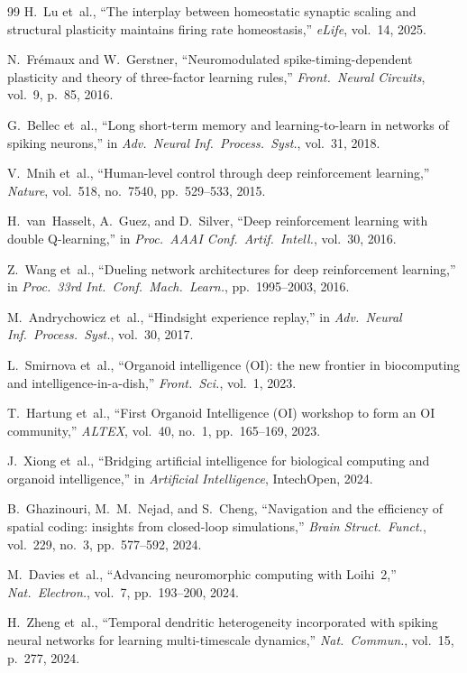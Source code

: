 \documentclass[journal,twocolumn]{IEEEtran}
\begin{document}
\begin{thebibliography}{99}
H.~Lu et~al., ``The interplay between homeostatic synaptic scaling and
structural plasticity maintains firing rate homeostasis,''
\emph{eLife}, vol.~14, 2025.

N.~Fr\'{e}maux and W.~Gerstner, ``Neuromodulated spike-timing-dependent
plasticity and theory of three-factor learning rules,''
\emph{Front.\ Neural Circuits}, vol.~9, p.~85, 2016.

G.~Bellec et~al., ``Long short-term memory and learning-to-learn in
networks of spiking neurons,'' in \emph{Adv.\ Neural Inf.\ Process.\
Syst.}, vol.~31, 2018.

V.~Mnih et~al., ``Human-level control through deep reinforcement
learning,'' \emph{Nature}, vol.~518, no.~7540, pp.~529--533, 2015.

H.~van~Hasselt, A.~Guez, and D.~Silver, ``Deep reinforcement learning
with double Q-learning,'' in \emph{Proc.\ AAAI Conf.\ Artif.\ Intell.},
vol.~30, 2016.

Z.~Wang et~al., ``Dueling network architectures for deep reinforcement
learning,'' in \emph{Proc.\ 33rd Int.\ Conf.\ Mach.\ Learn.},
pp.~1995--2003, 2016.

M.~Andrychowicz et~al., ``Hindsight experience replay,'' in
\emph{Adv.\ Neural Inf.\ Process.\ Syst.}, vol.~30, 2017.

L.~Smirnova et~al., ``Organoid intelligence (OI): the new frontier in
biocomputing and intelligence-in-a-dish,'' \emph{Front.\ Sci.},
vol.~1, 2023.

T.~Hartung et~al., ``First Organoid Intelligence (OI) workshop to
form an OI community,'' \emph{ALTEX}, vol.~40, no.~1,
pp.~165--169, 2023.

J.~Xiong et~al., ``Bridging artificial intelligence for biological
computing and organoid intelligence,'' in \emph{Artificial
Intelligence}, IntechOpen, 2024.

B.~Ghazinouri, M.~M.~Nejad, and S.~Cheng, ``Navigation and the
efficiency of spatial coding: insights from closed-loop simulations,''
\emph{Brain Struct.\ Funct.}, vol.~229, no.~3, pp.~577--592, 2024.

M.~Davies et~al., ``Advancing neuromorphic computing with Loihi~2,''
\emph{Nat.\ Electron.}, vol.~7, pp.~193--200, 2024.

H.~Zheng et~al., ``Temporal dendritic heterogeneity incorporated with
spiking neural networks for learning multi-timescale dynamics,''
\emph{Nat.\ Commun.}, vol.~15, p.~277, 2024.

\end{thebibliography}
\end{document}
